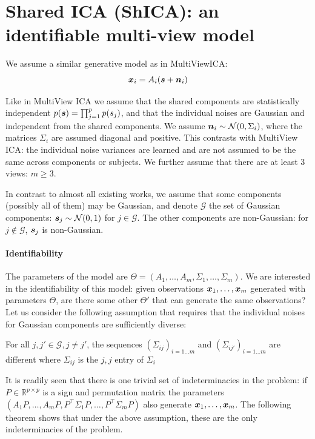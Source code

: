 \section{Shared ICA (ShICA): an identifiable multi-view model}
We assume a similar generative model as in MultiViewICA:
\begin{equation}
  \label{eq:model}
   \boldsymbol{x}_i = A_i(\boldsymbol{s} + \boldsymbol{n}_i)
\end{equation}

Like in MultiView ICA we assume that the shared components are statistically independent $p(\boldsymbol{s}) = \prod_{j=1}^p p(s_j)$, and
that the individual noises are Gaussian and independent from the shared
components. We assume $\boldsymbol{n}_i \sim\mathcal{N}(0, \Sigma_i)$, where the matrices
$\Sigma_i$ are assumed diagonal and positive. This contrasts with MultiView ICA: the individual noise variances are learned and are not assumed to be the same across
components or subjects.
We further assume that there are at least 3 views: $m \geq 3$. 

In contrast to almost all existing works, we assume that some components (possibly all of them) may be Gaussian, and denote $\mathcal{G}$ the set of Gaussian components: $\boldsymbol{s}_j \sim \mathcal{N}(0, 1)$ for $j \in \mathcal{G}$. The other components are non-Gaussian: for $j\notin \mathcal{G}$, $\boldsymbol{s}_j$ is non-Gaussian.


\paragraph{Identifiability} The parameters of the model are $\Theta = (A_1, \dots, A_m, \Sigma_1, \dots, \Sigma_m)$. We are interested in the identifiability of this model: given observations $\boldsymbol{x}_1,\dots, \boldsymbol{x}_m$ generated with parameters $\Theta$, are there some other $\Theta'$ that can generate the same observations?
Let us consider the following assumption that requires that the individual noises for Gaussian components are sufficiently diverse:
%
\begin{assumption}
\label{ass:diversity}
For all $j, j' \in \mathcal{G}, j \neq j'$, the sequences $(\Sigma_{ij})_{i=1 \dots m}$ and $(\Sigma_{ij'})_{i=1 \dots m}$ are different where $\Sigma_{ij}$ is the $j, j$ entry of $\Sigma_i$
\end{assumption}

It is readily seen that there is one trivial set of indeterminacies in the problem: if $P \in \mathbb{R}^{p \times p}$ is a sign and permutation matrix the parameters $(A_1 P, \dots, A_m P, P^{\top}\Sigma_1 P, \dots, P^{\top} \Sigma_m P)$ also generate $\boldsymbol{x}_1,\dots, \boldsymbol{x}_m$. The following theorem shows that under the above assumption, these are the only indeterminacies of the problem.

